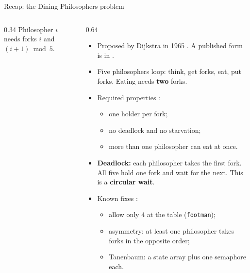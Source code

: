 \documentclass[aspectratio=169,10pt,xcolor=table]{beamer}
\newcommand{\code}[1]{\texttt{#1}}
\begin{document}
\begin{frame}{Recap: the Dining Philosophers problem}
\begin{columns}[T]
\begin{column}{0.34\textwidth}
            \vspace{2pt}
            \scriptsize Philosopher $i$ needs forks $i$ and $(i+1) \bmod 5$.
        \end{column}
        \begin{column}{0.64\textwidth}
            \small
            \begin{itemize}
                \setlength\itemsep{2pt}
                \item Proposed by Dijkstra in 1965 \cite{downey}. A published
                    form is in \cite{dijkstra}.
                \item Five philosophers loop: think, get forks, eat, put forks.
                    Eating needs \textbf{two} forks.
                \item Required properties \cite{downey}:
                    \begin{itemize}
                        \item one holder per fork;
                        \item no deadlock and no starvation;
                        \item more than one philosopher can eat at once.
                    \end{itemize}
                \item \textbf{Deadlock:} each philosopher takes the first fork. All
                    five hold one fork and wait for the next. This is a
                    \textbf{circular wait}.
                \item Known fixes \cite{downey,tanenbaum}:
                    \begin{itemize}
                        \item allow only 4 at the table (\code{footman});
                        \item asymmetry: at least one philosopher takes forks in
                            the opposite order;
                        \item Tanenbaum: a state array plus one semaphore each.
                    \end{itemize}
            \end{itemize}
        \end{column}
    \end{columns}
\end{frame}
\end{document}
